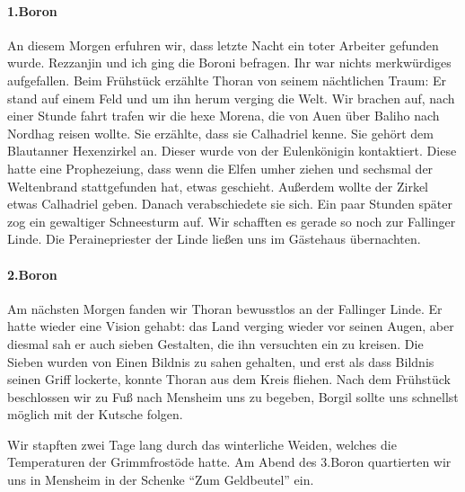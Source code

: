\paragraph{1.Boron}
An diesem Morgen erfuhren wir, dass letzte Nacht ein toter Arbeiter gefunden wurde. Rezzanjin und ich ging die Boroni befragen. Ihr war nichts merkwürdiges aufgefallen. Beim Frühstück erzählte Thoran von seinem nächtlichen Traum: Er stand auf einem Feld und um ihn herum verging die Welt. Wir brachen auf, nach einer Stunde fahrt trafen wir die hexe Morena, die von Auen über Baliho nach Nordhag reisen wollte. Sie erzählte, dass sie Calhadriel kenne. Sie gehört dem Blautanner Hexenzirkel an. Dieser wurde von der Eulenkönigin kontaktiert. Diese hatte eine Prophezeiung, dass wenn die Elfen umher ziehen und sechsmal der Weltenbrand stattgefunden hat, etwas geschieht. Außerdem wollte der Zirkel etwas Calhadriel geben. Danach verabschiedete sie sich. Ein paar Stunden später zog ein gewaltiger Schneesturm auf. Wir schafften es gerade so noch zur Fallinger Linde. Die Perainepriester der Linde ließen uns im Gästehaus übernachten.

\paragraph{2.Boron}
Am nächsten Morgen fanden wir Thoran bewusstlos an der Fallinger Linde. Er hatte wieder eine Vision gehabt: das Land verging wieder vor seinen Augen, aber diesmal sah er auch sieben Gestalten, die ihn versuchten ein zu kreisen. Die Sieben wurden von Einen Bildnis zu sahen gehalten, und erst als dass Bildnis seinen Griff lockerte, konnte Thoran aus dem Kreis fliehen. Nach dem Frühstück beschlossen wir zu Fuß nach Mensheim uns zu begeben, Borgil sollte uns schnellst möglich mit der Kutsche folgen.

Wir stapften zwei Tage lang durch das winterliche Weiden, welches die Temperaturen der Grimmfrostöde hatte. Am Abend des 3.Boron quartierten wir uns in Mensheim in der Schenke ``Zum Geldbeutel'' ein.


